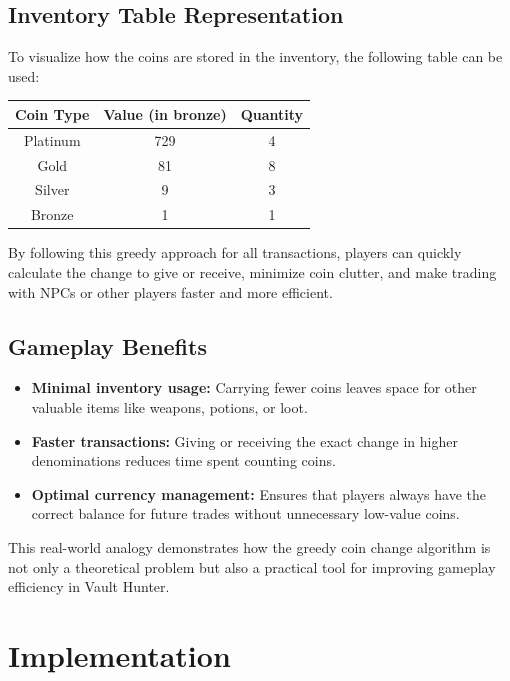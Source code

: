 \documentclass[12pt,a4paper]{report}
\begin{document}
\subsection{Inventory Table Representation}

To visualize how the coins are stored in the inventory, the following table can be used:

\begin{center}
\begin{tabular}{|c|c|c|}
\hline
\textbf{Coin Type} & \textbf{Value (in bronze)} & \textbf{Quantity} \\
\hline
Platinum & 729 & 4 \\
Gold & 81 & 8 \\
Silver & 9 & 3 \\
Bronze & 1 & 1 \\
\hline
\end{tabular}
\end{center}

\noindent By following this greedy approach for all transactions, players can quickly calculate the change to give or receive, minimize coin clutter, and make trading with NPCs or other players faster and more efficient.

\subsection{Gameplay Benefits}

\begin{itemize}
    \item \textbf{Minimal inventory usage:} Carrying fewer coins leaves space for other valuable items like weapons, potions, or loot.  
    \item \textbf{Faster transactions:} Giving or receiving the exact change in higher denominations reduces time spent counting coins.  
    \item \textbf{Optimal currency management:} Ensures that players always have the correct balance for future trades without unnecessary low-value coins.  
\end{itemize}

This real-world analogy demonstrates how the greedy coin change algorithm is not only a theoretical problem but also a practical tool for improving gameplay efficiency in Vault Hunter.

\section{Implementation}
\end{document}
